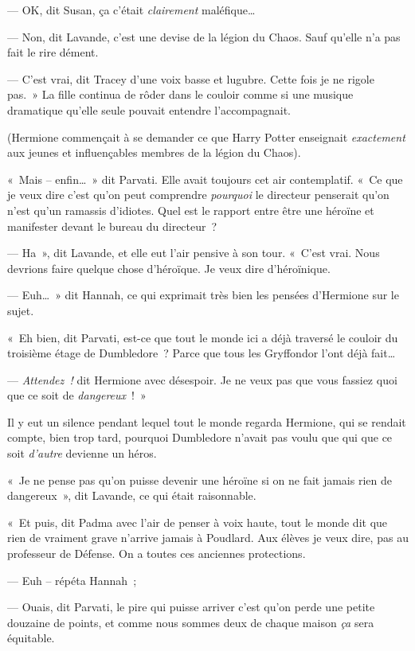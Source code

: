 --- OK, dit Susan, ça c'était \emph{clairement} maléfique…

--- Non, dit Lavande, c'est une devise de la légion du Chaos. Sauf qu'elle n'a pas fait le rire dément.

--- C'est vrai, dit Tracey d'une voix basse et lugubre. Cette fois je ne rigole pas.~» La fille continua de rôder dans le couloir comme si une musique dramatique qu'elle seule pouvait entendre l'accompagnait.

(Hermione commençait à se demander ce que Harry Potter enseignait \emph{exactement} aux jeunes et influençables membres de la légion du Chaos).

«~Mais -- enfin…~» dit Parvati. Elle avait toujours cet air contemplatif. «~Ce que je veux dire c'est qu'on peut comprendre \emph{pourquoi} le directeur penserait qu'on n'est qu'un ramassis d'idiotes. Quel est le rapport entre être une héroïne et manifester devant le bureau du directeur~?

--- Ha~», dit Lavande, et elle eut l'air pensive à son tour. «~C'est vrai. Nous devrions faire quelque chose d'héroïque. Je veux dire d'héroïnique.

--- Euh…~» dit Hannah, ce qui exprimait très bien les pensées d'Hermione sur le sujet.

«~Eh bien, dit Parvati, est-ce que tout le monde ici a déjà traversé le couloir du troisième étage de Dumbledore~? Parce que tous les Gryffondor l'ont déjà fait…

--- \emph{Attendez~!} dit Hermione avec désespoir. Je ne veux pas que vous fassiez quoi que ce soit de \emph{dangereux}~!~»

Il y eut un silence pendant lequel tout le monde regarda Hermione, qui se rendait compte, bien trop tard, pourquoi Dumbledore n'avait pas voulu que qui que ce soit \emph{d'autre} devienne un héros.

«~Je ne pense pas qu'on puisse devenir une héroïne si on ne fait jamais rien de dangereux~», dit Lavande, ce qui était raisonnable.

«~Et puis, dit Padma avec l'air de penser à voix haute, tout le monde dit que rien de vraiment grave n'arrive jamais à Poudlard. Aux élèves je veux dire, pas au professeur de Défense. On a toutes ces anciennes protections.

--- Euh -- répéta Hannah~;

--- Ouais, dit Parvati, le pire qui puisse arriver c'est qu'on perde une petite douzaine de points, et comme nous sommes deux de chaque maison \emph{ça} sera équitable.

